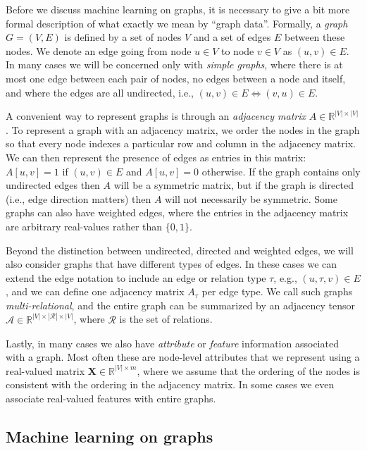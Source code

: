 \documentclass[10pt]{book}
\let\defaultmarginpar\marginpar
\renewcommand\marginpar[2][]{\defaultmarginpar{\itshape\color{gray}#2}}
\begin{document}
Before we discuss machine learning on graphs, it is necessary to give a bit more formal description of what exactly we mean by ``graph data''. Formally, a \emph{graph}\marginpar{graph} $G = (V, E)$ is defined by a set of nodes $V$ and a set of edges $E$ between these nodes. We denote an edge going from node $u \in V$ to node $v \in V$ as $(u, v) \in E$. In many cases we will be concerned only with \emph{simple graphs}, where there is at most one edge between each pair of nodes, no edges between a node and itself, and where the edges are all undirected, i.e., $(u, v) \in E \Longleftrightarrow (v, u) \in E$.

A convenient way to represent graphs is through an \emph{adjacency matrix}\marginpar{adjacency matrix} $A \in \mathbb R^{|V| \times |V|}$. To represent a graph with an adjacency matrix, we order the nodes in the graph so that every node indexes a particular row and column in the adjacency matrix. We can then represent the presence of edges as entries in this matrix: $A[u, v] = 1$ if $(u, v) \in E$ and $A[u, v] = 0$ otherwise. If the graph contains only undirected edges then $A$ will be a symmetric matrix, but if the graph is directed (i.e., edge direction matters) then $A$ will not necessarily be symmetric. Some graphs can also have weighted edges, where the entries in the adjacency matrix are arbitrary real-values rather than $\{0, 1\}$.

Beyond the distinction between undirected, directed and weighted edges, we will also consider graphs that have different types of edges. In these cases we can extend the edge notation to include an edge or relation type $\tau$, e.g., $(u, \tau, v) \in E$, and we can define one adjacency matrix $A_\tau$ per edge type. We call such graphs \emph{multi-relational}\marginpar{multi-relational graph}, and the entire graph can be summarized by an adjacency tensor $\mathcal A \in \mathbb R^{|V| \times |\mathcal R| \times |V|}$, where $\mathcal R$ is the set of relations.

Lastly, in many cases we also have \emph{attribute} or \emph{feature} information associated with a graph. Most often these are node-level attributes that we represent using a real-valued matrix $\mathbf X \in \mathbb R^{|V| \times m}$, where we assume that the ordering of the nodes is consistent with the ordering in the adjacency matrix. In some cases we even associate real-valued features with entire graphs.

\subsection{Machine learning on graphs}
\end{document}
